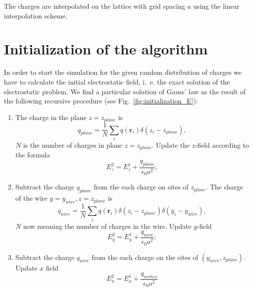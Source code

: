 \documentclass[a4paper, 12pt]{article}
\newcommand{\vect}[1]{\mathbf{#1}}
\begin{document}
The charges are interpolated on the lattice
with grid spacing $a$ using the linear interpolation scheme.
%
\section{Initialization of the algorithm}
%
In order to start the simulation for the given random distribution of
charges we have to calculate the initial electrostatic field, i.~e. the
exact solution of the electrostatic problem. We find a particular solution of Gauss' law as
the result of the following recursive procedure (see
Fig.~\ref{fig:initialization_E}):
\begin{enumerate}
\item The charge in the plane $z=z_{plane}$ is 
\begin{equation}
q_{plane}=\frac{1}{N}\sum_iq(\vect r_i)\delta(z_i-z_{plane}),
\end{equation}
$N$ is the number of charges in plane $z=z_{plane}$. Update the
$z$-field according to the formula
\begin{equation}
E_z^2=E_z^1+\frac{q_{plane}}{\epsilon_0a^2};
\end{equation}
\item Subtract the
charge $q_{plane}$ from the each charge on sites of $z_{plane}$. The
charge of the wire $y=y_{wire}, z=z_{plane}$ is
\begin{equation}
q_{wire}=\frac{1}{N}\sum_iq(\vect r_i)\delta(z_i-z_{plane})\delta(y_i-y_{wire}),
\end{equation}
 $N$ now meaning the
number of charges in the wire. Update $y$-field
\begin{equation}
E_y^2=E_y^1+\frac{q_{wire}}{\epsilon_0a^2};
\end{equation}
\item Subtract the charge $q_{wire}$ from the each charge on the sites of
$(y_{wire},z_{plane})$. Update $x$ field 
\begin{equation}
E_x^2=E_x^1+\frac{q_{vertex}}{\epsilon_0a^2}
\end{equation}
\end{enumerate}
\end{document}
